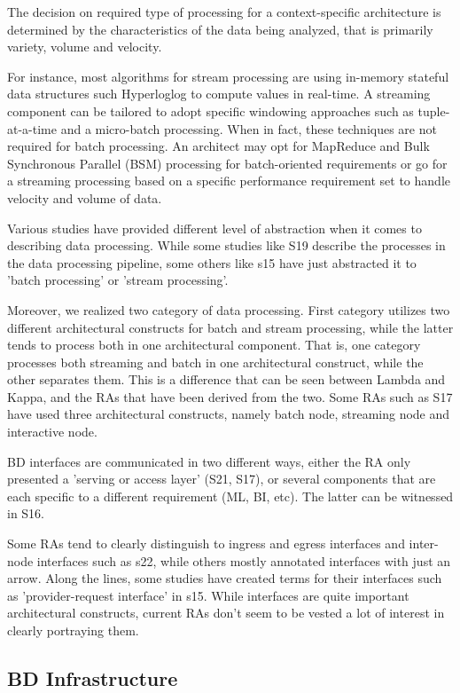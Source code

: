 \documentclass{ieeeaccess}
\begin{document}
The decision on required type of processing for a context-specific architecture is determined by the characteristics of the data being analyzed, that is primarily variety, volume and velocity. 

For instance, most algorithms for stream processing are using in-memory stateful data structures such Hyperloglog to compute values in real-time. A streaming component can be tailored to adopt specific windowing approaches such as tuple-at-a-time and a micro-batch processing. When in fact, these techniques are not required for batch processing. An architect may opt for MapReduce and Bulk Synchronous Parallel (BSM) processing for batch-oriented requirements or go for a streaming processing based on a specific performance requirement set to handle velocity and volume of data. 

Various studies have provided different level of abstraction when it comes to describing data processing. While some studies like S19 describe the processes in the data processing pipeline, some others like s15 have just abstracted it to 'batch processing' or 'stream processing'. 

Moreover, we realized two category of data processing. First category utilizes two different architectural constructs for batch and stream processing, while the latter tends to process both in one architectural component. That is, one category processes both streaming and batch in one architectural construct, while the other separates them. This is a difference that can be seen between Lambda and Kappa, and the RAs that have been derived from the two. Some RAs such as S17 have used three architectural constructs, namely batch node, streaming node and interactive node. 

BD interfaces are communicated in two different ways, either the RA only presented a 'serving or access layer' (S21, S17), or several components that are each specific to a different requirement (ML, BI, etc). The latter can be witnessed in S16.

Some RAs tend to clearly distinguish to ingress and egress interfaces and inter-node interfaces such as s22, while others mostly annotated interfaces with just an arrow. Along the lines, some studies have created terms for their interfaces such as 'provider-request interface' in s15. While interfaces are quite important architectural constructs, current RAs don't seem to be vested a lot of interest in clearly portraying them. 

\subsection{BD Infrastructure}
\end{document}
